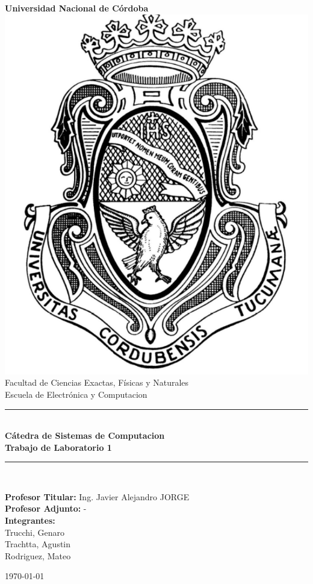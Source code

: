 \begin{titlepage}
    \begin{center}
        {\LARGE \textbf{Universidad Nacional de Córdoba}}\\[1.5cm]

        \includegraphics[scale=0.4]{img/logo2.png}\\[1.5cm]

        {\large Facultad de Ciencias Exactas, Físicas y Naturales}\\
        {\large Escuela de Electrónica y Computacion}\\[1cm]

        \rule{\linewidth}{0.5mm}\\[0.4cm]
        {\Large \textbf{Cátedra de Sistemas de Computacion}}\\[0.3cm]
        {\LARGE \textbf{Trabajo de Laboratorio 1}}\\[0.3cm]
        \rule{\linewidth}{0.5mm}\\[1cm]

        \begin{flushleft}
        {\large 
            \textbf{Profesor Titular:} Ing. Javier Alejandro JORGE\\
            \textbf{Profesor Adjunto:} -\\[0.5cm]
            \textbf{Integrantes:}\\
            Trucchi, Genaro\\
            Trachtta, Agustin\\
            Rodriguez, Mateo\\
        }
        \end{flushleft}

        \vfill

        {\large \today}
    \end{center}
\end{titlepage}
